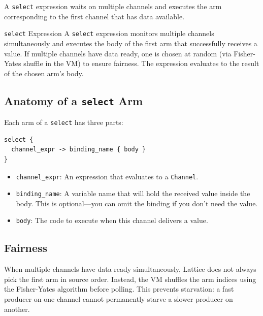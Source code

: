 A \lstinline|select| expression waits on multiple channels and executes the arm corresponding to the first channel that has data available.

\begin{defnbox}{\texttt{select} Expression}
A \lstinline|select| expression monitors multiple channels simultaneously and executes the body of the first arm that successfully receives a value.
If multiple channels have data ready, one is chosen at random (via Fisher-Yates shuffle in the VM) to ensure fairness.
The expression evaluates to the result of the chosen arm's body.
\end{defnbox}

\subsection{Anatomy of a \texttt{select} Arm}

Each arm of a \lstinline|select| has three parts:

\begin{lstlisting}[language=Lattice, caption={Select arm anatomy}]
select {
  channel_expr -> binding_name { body }
}
\end{lstlisting}

\begin{itemize}
  \item \texttt{channel\_expr}: An expression that evaluates to a \lstinline|Channel|.
  \item \texttt{binding\_name}: A variable name that will hold the received value inside the body. This is optional---you can omit the binding if you don't need the value.
  \item \texttt{body}: The code to execute when this channel delivers a value.
\end{itemize}

\subsection{Fairness}


When multiple channels have data ready simultaneously, Lattice does not always pick the first arm in source order.
Instead, the VM shuffles the arm indices using the Fisher-Yates algorithm before polling.
This prevents starvation: a fast producer on one channel cannot permanently starve a slower producer on another.

